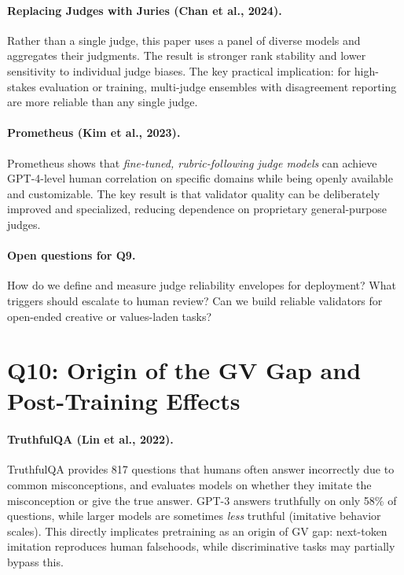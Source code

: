 \documentclass[11pt]{article}
\begin{document}
\paragraph{Replacing Judges with Juries (Chan et al., 2024).}
Rather than a single judge, this paper uses a panel of diverse models and aggregates their judgments. The result is stronger rank stability and lower sensitivity to individual judge biases. The key practical implication: for high-stakes evaluation or training, multi-judge ensembles with disagreement reporting are more reliable than any single judge.

\paragraph{Prometheus (Kim et al., 2023).}
Prometheus shows that \emph{fine-tuned, rubric-following judge models} can achieve GPT-4-level human correlation on specific domains while being openly available and customizable. The key result is that validator quality can be deliberately improved and specialized, reducing dependence on proprietary general-purpose judges.

\paragraph{Open questions for Q9.}
How do we define and measure judge reliability envelopes for deployment? What triggers should escalate to human review? Can we build reliable validators for open-ended creative or values-laden tasks?

\section{Q10: Origin of the GV Gap and Post-Training Effects}

\paragraph{TruthfulQA (Lin et al., 2022).}
TruthfulQA provides 817 questions that humans often answer incorrectly due to common misconceptions, and evaluates models on whether they imitate the misconception or give the true answer. GPT-3 answers truthfully on only 58\% of questions, while larger models are sometimes \emph{less} truthful (imitative behavior scales). This directly implicates pretraining as an origin of GV gap: next-token imitation reproduces human falsehoods, while discriminative tasks may partially bypass this.
\end{document}
